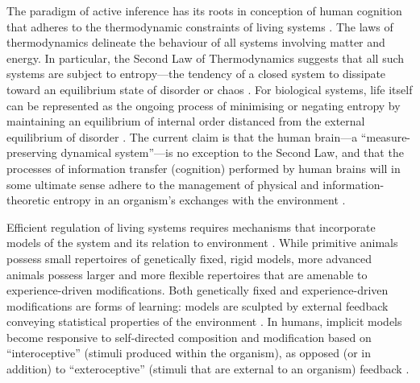 \begin{CJK}{UTF8}{gbsn}
The paradigm of active inference has its roots in conception of human cognition that adheres to the thermodynamic constraints of living systems \citep{Carhart-Harris2014,Yufik2017}.  The laws of thermodynamics delineate the behaviour of all systems involving matter and energy.  In particular, the Second Law of Thermodynamics suggests that all such systems are subject to entropy---the tendency of a closed system to dissipate toward an equilibrium state of disorder or chaos \citep{Wolfram2002}.  For biological systems, life itself can be represented as the ongoing process of minimising or negating entropy by maintaining an equilibrium of internal order distanced from the external equilibrium of disorder \citep{Schrödinger1944}.  The current claim is that the human brain---a ``measure-preserving dynamical system''---is no exception to the Second Law, and that the processes of information transfer (cognition) performed by human brains will in some ultimate sense adhere to the management of physical and information-theoretic entropy in an organism's exchanges with the environment \citep{Yufik2002,Yufik2013,Friston2010Sengupta2013,Sengupta2016,Sengupta2017}.

Efficient regulation of living systems requires mechanisms that incorporate models of the system and its relation to environment \citep{Conant1970}.  While primitive animals possess small repertoires of genetically fixed, rigid models, more advanced animals possess larger and more flexible repertoires that are amenable to experience-driven modifications.  Both genetically fixed and experience-driven modifications are forms of learning: models are sculpted by external feedback conveying statistical properties of the environment \citep{Yufik2013}.  In humans, implicit models become responsive to self-directed composition and modification based on ``interoceptive'' (stimuli produced within the organism), as opposed (or in addition) to ``exteroceptive'' (stimuli that are external to an organism) feedback \citep{Yufik1998}.


\end{CJK}
